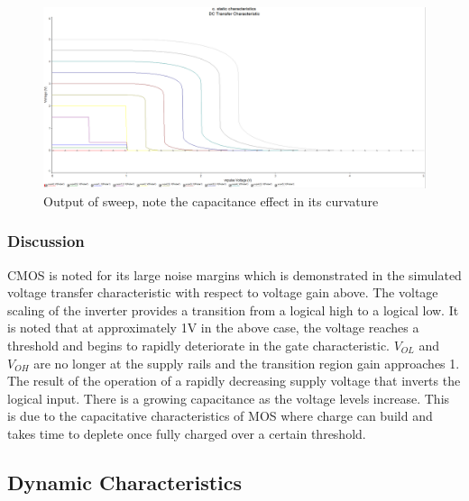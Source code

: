 \documentclass[12pt]{article}
\begin{document}
\begin{figure}[H]
\centering
\includegraphics[width=1\textwidth]{c13.PNG}
\caption{Output of sweep, note the capacitance effect in its curvature}
\end{figure}

\subsubsection{Discussion}
CMOS is noted for its large noise margins which is demonstrated in the simulated voltage transfer characteristic with respect to voltage gain above. The voltage scaling of the inverter provides a transition from a logical high to a logical low. It is noted that at approximately 1V in the above case, the voltage reaches a threshold and begins to rapidly deteriorate in the gate characteristic. $V_{OL}$ and $V_{OH}$ are no longer at the supply rails and the transition region gain approaches 1. The result of the operation of a rapidly decreasing supply voltage that inverts the logical input. There is a growing capacitance as the voltage levels increase. This is due to the capacitative characteristics of MOS where charge can build and takes time to deplete once fully charged over a certain threshold.

\subsection{Dynamic Characteristics}
\end{document}
